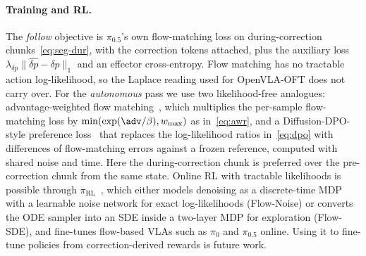 \paragraph{Training and RL.}
The \emph{follow} objective is $\pi_{0.5}$'s own flow-matching loss on during-correction chunks~\eqref{eq:seg-dur}, with the correction tokens attached, plus the auxiliary loss $\lambda_{\delta p}\lVert\widehat{\delta p}-\delta p\rVert_1$ and an effector cross-entropy. Flow matching has no tractable action log-likelihood, so the Laplace reading used for OpenVLA-OFT does not carry over. For the \emph{autonomous} pass we use two likelihood-free analogues: advantage-weighted flow matching~\citep{peng2019awr}, which multiplies the per-sample flow-matching loss by $\min(\exp(\adv/\beta), w_{\max})$ as in~\eqref{eq:awr}, and a Diffusion-DPO-style preference loss~\citep{wallace2024diffusiondpo} that replaces the log-likelihood ratios in~\eqref{eq:dpo} with differences of flow-matching errors against a frozen reference, computed with shared noise and time. Here the during-correction chunk is preferred over the pre-correction chunk from the same state. Online RL with tractable likelihoods is possible through $\pi_{\mathrm{RL}}$~\citep{chen2025pirl}, which either models denoising as a discrete-time MDP with a learnable noise network for exact log-likelihoods (Flow-Noise) or converts the ODE sampler into an SDE inside a two-layer MDP for exploration (Flow-SDE), and fine-tunes flow-based VLAs such as $\pi_0$ and $\pi_{0.5}$ online. Using it to fine-tune \meci policies from correction-derived rewards is future work.

